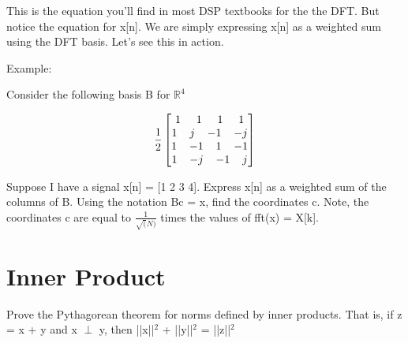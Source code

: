 \documentclass[11pt]{article}
\begin{document}
\vspace{3mm}

This is the equation you'll find in most DSP textbooks for the the DFT. But notice the equation for x[n]. We are simply expressing x[n] as a weighted sum using the DFT basis. Let's see this in action.

Example:

Consider the following basis B for $\mathbb{R}^4$
\begin{center}

\[
\frac{1}{2}
\begin{bmatrix}
 1\hspace{5mm} 1\hspace{5mm} 1 \hspace{5mm}1\\
 1\hspace{4mm} j\hspace{4mm} {-1}\hspace{4mm} {-j} \\
1 \hspace{4mm}{-1}\hspace{4mm} 1 \hspace{4mm}{-1}\\
1\hspace{4mm} {-j}\hspace{4mm} {-1}\hspace{4mm} j
\end{bmatrix}
\]

\end{center}

Suppose I have a signal x[n] = [1 2 3 4].  Express x[n] as a weighted sum of the columns of B. Using the notation Bc = x, find the coordinates c. Note, the coordinates c are equal to $\frac{1}{\sqrt(N)}$ times the values of fft(x) = X[k].

\section{Inner Product}
Prove the Pythagorean theorem for norms defined by inner products. That is, if z = x + y and \newline
x $\perp$ y, then ||x||$^2$ + ||y||$^2$ = ||z||$^2$
\end{document}
